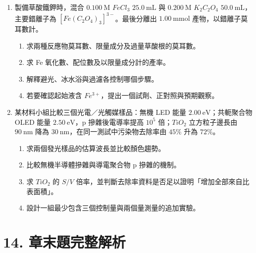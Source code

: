 \documentclass[11pt,a4paper]{article}
\begin{document}
\begin{enumerate}
  \begin{enumerate}
  \def\labelenumii{(\alph{enumii})}
  \item
    主承力且需最低質量的外殼，依表選一種並說明兩項結構理由。
  \item
    需要透明觀察窗時選哪一種？用 \(Si-O\) 網路與非晶體描述其材料類型。
  \item
    需要同時作電磁屏蔽與可修復金屬骨架時，哪一種資料最直接支持選擇？
  \item
    說明三種材料各還需一項未列在表中的實際驗證。
  \end{enumerate}
\item
  製備草酸鐵鉀時，混合 \(0.100\ \mathrm{M}\) \(FeCl_3\) \(25.0\ \mathrm{mL}\) 與 \(0.200\ \mathrm{M}\) \(K_2C_2O_4\) \(50.0\ \mathrm{mL}\)，主要錯離子為 \([Fe(C_2O_4)_3]^{3-}\)。最後分離出 \(1.00\ \mathrm{mmol}\) 產物，以錯離子莫耳數計。

  \begin{enumerate}
  \def\labelenumii{(\alph{enumii})}
  \item
    求兩種反應物莫耳數、限量成分及過量草酸根的莫耳數。
  \item
    求 Fe 氧化數、配位數及以限量成分計的產率。
  \item
    解釋避光、冰水浴與過濾各控制哪個步驟。
  \item
    若要確認起始液含 \(Fe^{3+}\)，提出一個試劑、正對照與預期觀察。
  \end{enumerate}
\item
  某材料小組比較三個光電／光觸媒樣品：無機 LED 能量 \(2.00\ \mathrm{eV}\)；共軛聚合物 OLED 能量 \(2.50\ \mathrm{eV}\)，p 摻雜後電導率提高 \(10^5\) 倍；\(TiO_2\) 立方粒子邊長由 \(90\ \mathrm{nm}\) 降為 \(30\ \mathrm{nm}\)，在同一測試中污染物去除率由 \(45\%\) 升為 \(72\%\)。

  \begin{enumerate}
  \def\labelenumii{(\alph{enumii})}
  \item
    求兩個發光樣品的估算波長並比較顏色趨勢。
  \item
    比較無機半導體摻雜與導電聚合物 p 摻雜的機制。
  \item
    求 \(TiO_2\) 的 \(S/V\) 倍率，並判斷去除率資料是否足以證明「增加全部來自比表面積」。
  \item
    設計一組最少包含三個控制量與兩個量測量的追加實驗。
  \end{enumerate}
\end{enumerate}

\section{14. 章末題完整解析}\label{ux7ae0ux672bux984cux5b8cux6574ux89e3ux6790}
\end{document}
